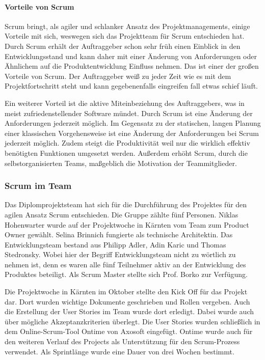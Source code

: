 \paragraph{Vorteile von Scrum}
Scrum bringt, als agiler und schlanker Ansatz des Projektmanagements, einige Vorteile mit sich, weswegen sich das Projektteam für Scrum entschieden hat. Durch Scrum erhält der Auftraggeber schon sehr früh einen Einblick in den Entwicklungsstand und kann daher mit einer Änderung von Anforderungen oder Ähnlichem auf die Produktentwicklung Einfluss nehmen. Das ist einer der großen Vorteile von Scrum. Der Auftraggeber weiß zu jeder Zeit wie es mit dem Projektfortschritt steht und kann gegebenenfalls eingreifen fall etwas schief läuft.

Ein weiterer Vorteil ist die aktive Miteinbeziehung des Auftraggebers, was in meist zufriedenstellender Software mündet. Durch Scrum ist eine Änderung der Anforderungen jederzeit möglich. Im Gegensatz zu der statischen, langen Planung einer klassischen Vorgehensweise ist eine Änderung der Anforderungen bei Scrum jederzeit möglich. Zudem steigt die Produktivität weil nur die wirklich effektiv benötigten Funktionen umgesetzt werden. Außerdem erhöht Scrum, durch die selbstorganisierten Teams, maßgeblich die Motivation der Teammitglieder.

\subsubsection{Scrum im Team}
Das Diplomprojektsteam hat sich für die Durchführung des Projektes für den agilen Ansatz Scrum entschieden. Die Gruppe zählte fünf Personen. Niklas Hohenwarter wurde auf der Projektwoche in Kärnten vom Team zum Product Owner gewählt. Selina Brinnich fungierte als technische Architektin. Das Entwicklungsteam bestand aus Philipp Adler, Adin Karic und Thomas Stedronsky. Wobei hier der Begriff Entwicklungsteam nicht zu wörtlich zu nehmen ist, denn es waren alle fünf Teilnehmer aktiv an der Entwicklung des Produktes beteiligt. Als Scrum Master stellte sich Prof. Borko zur Verfügung.

Die Projektwoche in Kärnten im Oktober stellte den Kick Off für das Projekt dar. Dort wurden wichtige Dokumente geschrieben und Rollen vergeben. Auch die Erstellung der User Stories im Team wurde dort erledigt. Dabei wurde auch über mögliche Akzeptanzkriterien überlegt. Die User Stories wurden schließlich in dem Online-Scrum-Tool Ontime von Axosoft eingefügt. Ontime wurde auch für den weiteren Verlauf des Projects als Unterstützung für den Scrum-Prozess verwendet. Als Sprintlänge wurde eine Dauer von drei Wochen bestimmt.

